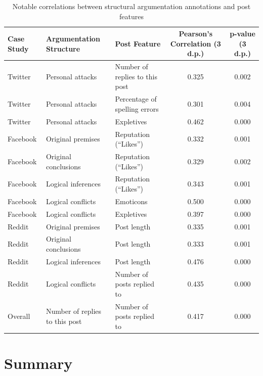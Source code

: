 \begin{table}
\centering
\caption{Notable correlations between structural argumentation annotations and post features}
\label{table:correlations}
\begin{tabular}{| l | l | l | c | c |}
\hline
\textbf{Case Study} & \textbf{Argumentation Structure} & \textbf{Post Feature} & \textbf{Pearson's Correlation (3 d.p.)} & \textbf{p-value (3 d.p.)}\\
\hline
Twitter & Personal attacks & Number of replies to this post & 0.325 & 0.002\\
\hline
Twitter & Personal attacks & Percentage of spelling errors & 0.301 & 0.004\\
\hline
Twitter & Personal attacks & Expletives & 0.462 & 0.000\\
\hline
Facebook & Original premises & Reputation (``Likes'') & 0.332 & 0.001\\
\hline
Facebook & Original conclusions & Reputation (``Likes'') & 0.329 & 0.002\\
\hline
Facebook & Logical inferences & Reputation (``Likes'') & 0.343 & 0.001\\
\hline
Facebook & Logical conflicts & Emoticons & 0.500 & 0.000\\
\hline
Facebook & Logical conflicts & Expletives & 0.397 & 0.000\\
\hline
Reddit & Original premises & Post length & 0.335 & 0.001\\
\hline
Reddit & Original conclusions & Post length & 0.333 & 0.001\\
\hline
Reddit & Logical inferences & Post length & 0.476 & 0.000\\
\hline
Reddit & Logical conflicts & Number of posts replied to & 0.435 & 0.000\\
\hline
Overall & Number of replies to this post & Number of posts replied to & 0.417 & 0.000\\
\hline
\end{tabular}
\end{table}

\section{Summary}
